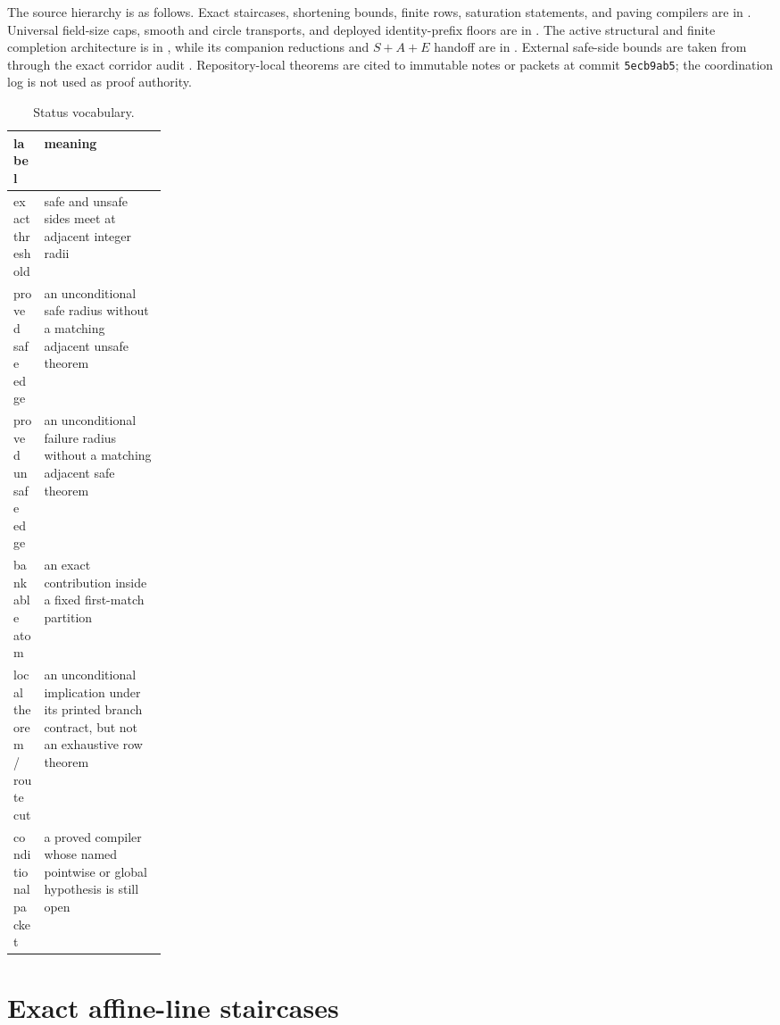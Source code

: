 \documentclass[11pt,a4paper]{amsart}
\numberwithin{equation}{section}
\theoremstyle{remark}
\begin{document}
The source hierarchy is as follows.  Exact staircases, shortening bounds, finite rows, saturation statements, and paving compilers are in \cite{ChoShort26,ChoThresholds26}.  Universal field-size caps, smooth and circle transports, and deployed identity-prefix floors are in \cite{ChoCap26}.  The active structural and finite completion architecture is in \cite{ChoGF26}, while its companion reductions and $S{+}A{+}E$ handoff are in \cite{ChoComp26}.  External safe-side bounds are taken from \cite{GKL24,Hab25} through the exact corridor audit \cite{Corridor26}.  Repository-local theorems are cited to immutable notes or packets at commit \texttt{5ecb9ab5}; the coordination log is not used as proof authority.

\begin{table}[ht]
\centering
\caption{Status vocabulary.}
\label{tab:status}
\small
\begin{tabularx}{\textwidth}{@{}p{0.20\linewidth}X@{}}
\toprule
label & meaning\\
\midrule
exact threshold & safe and unsafe sides meet at adjacent integer radii\\
proved safe edge & an unconditional safe radius without a matching adjacent unsafe theorem\\
proved unsafe edge & an unconditional failure radius without a matching adjacent safe theorem\\
bankable atom & an exact contribution inside a fixed first-match partition\\
local theorem / route cut & an unconditional implication under its printed branch contract, but not an exhaustive row theorem\\
conditional packet & a proved compiler whose named pointwise or global hypothesis is still open\\
\bottomrule
\end{tabularx}
\end{table}

\section{Exact affine-line staircases}
\end{document}
